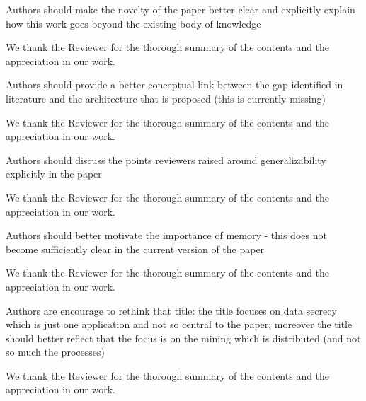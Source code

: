 %
%
\begin{MetaReviewComment}
Authors should make the novelty of the paper better clear and explicitly explain how this work goes beyond the existing body of knowledge
\end{MetaReviewComment}
%
\begin{Answer}
We thank the Reviewer for the thorough summary of the contents and the appreciation in our work. 

 \RevTaskDone
\end{Answer}
%
\begin{MetaReviewComment}
Authors should provide a better conceptual link between the gap identified in literature and the architecture that is proposed (this is currently missing)
\end{MetaReviewComment}
%
\begin{Answer}
	We thank the Reviewer for the thorough summary of the contents and the appreciation in our work.
	 \RevTaskDone
\end{Answer}
%
\begin{MetaReviewComment}
Authors should discuss the points reviewers raised around generalizability explicitly in the paper
\end{MetaReviewComment}
\begin{Answer}
	We thank the Reviewer for the thorough summary of the contents and the appreciation in our work.
	 \RevTaskDone
\end{Answer}
%
\begin{MetaReviewComment}
Authors should better motivate the importance of memory - this does not become sufficiently clear in the current version of the paper
\end{MetaReviewComment}
\begin{Answer}
	We thank the Reviewer for the thorough summary of the contents and the appreciation in our work.
	 \RevTaskDone
\end{Answer}
%
\begin{MetaReviewComment}
Authors are encourage to rethink that title: the title focuses on data secrecy which is just one application and not so central to the paper; moreover the title should better reflect that the focus is on the mining which is distributed (and not so much the processes)
\end{MetaReviewComment}
\begin{Answer}
	We thank the Reviewer for the thorough summary of the contents and the appreciation in our work.
	 \RevTaskDone
\end{Answer}
%
%
%
%
